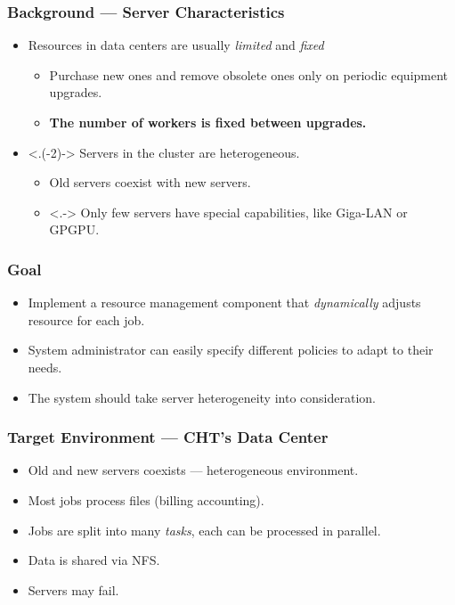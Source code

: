 \begin{frame}
  \frametitle{Background --- Server Characteristics}
  \begin{itemize}[<+->]
    \item Resources in data centers are usually \emph{limited} and
      \emph{fixed}
      \begin{itemize}
        \item Purchase new ones and remove obsolete ones only on
          periodic equipment upgrades.
        \item \textbf{The number of workers is fixed between upgrades.}
      \end{itemize}
    \item <.(-2)-> Servers in the cluster are \alert{heterogeneous}.
      \begin{itemize}
        \item Old servers coexist with new servers.
        \item <.-> Only few servers have special capabilities, like Giga-LAN
          or GPGPU.
      \end{itemize}
  \end{itemize}
\end{frame}
\begin{frame}
  \frametitle{Goal}
  \begin{itemize}
    \item Implement a resource management component that \emph{dynamically}
      adjusts resource for each job.
    \item System administrator can easily specify different policies to
      adapt to their needs.
    \item The system should take server \alert{heterogeneity} into consideration.
  \end{itemize}
\end{frame}
\begin{frame}
  \frametitle{Target Environment --- CHT's Data Center}
  \begin{itemize}
    \item Old and new servers coexists --- heterogeneous environment.
    \item Most jobs process files (billing accounting).
    \item Jobs are split into many \emph{tasks}, each can be processed
      in parallel.
    \item Data is shared via NFS.
    \item Servers may fail.
  \end{itemize}
\end{frame}

